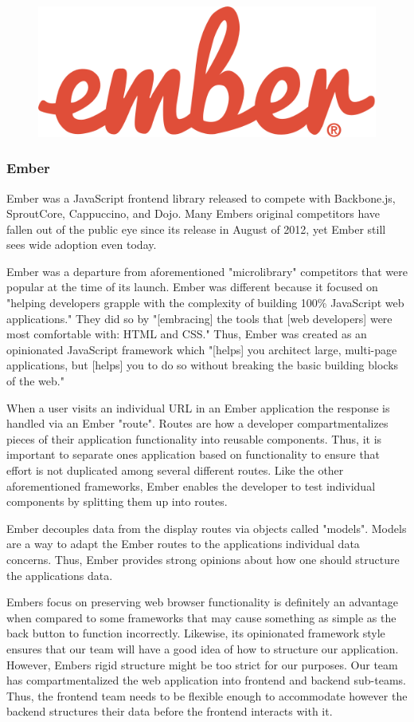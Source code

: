 \documentclass[12pt]{article}
\begin{document}
\begin{figure}[h]
	\centering
	\includegraphics[width=0.25\linewidth]{ember}
\end{figure}

\subsubsection{Ember}

Ember was a JavaScript frontend library released to compete with Backbone.js, SproutCore, Cappuccino, and Dojo.\cite{emberrelease} Many Embers original competitors have fallen out of the public eye since its release in August of 2012, yet Ember still sees wide adoption even today.

Ember was a departure from aforementioned "microlibrary" competitors that were popular at the time of its launch. Ember was different because it focused on "helping developers grapple with the complexity of building 100\% JavaScript web applications."\cite{emberrelease} They did so by "[embracing] the tools that [web developers] were most comfortable with: HTML and CSS."\cite{emberrelease} Thus, Ember was created as an opinionated JavaScript framework which "[helps] you architect large, multi-page applications, but [helps] you to do so without breaking the basic building blocks of the web."\cite{emberrelease}

When a user visits an individual URL in an Ember application the response is handled via an Ember "route".\cite{emberrouting} Routes are how a developer compartmentalizes pieces of their application functionality into reusable components. Thus, it is important to separate ones application based on functionality to ensure that effort is not duplicated among several different routes. Like the other aforementioned frameworks, Ember enables the developer to test individual components by splitting them up into routes.

Ember decouples data from the display routes via objects called "models".\cite{embermodel} Models are a way to adapt the Ember routes to the applications individual data concerns. Thus, Ember provides strong opinions about how one should structure the applications data.

Embers focus on preserving web browser functionality is definitely an advantage when compared to some frameworks that may cause something as simple as the back button to function incorrectly. Likewise, its opinionated framework style ensures that our team will have a good idea of how to structure our application. However, Embers rigid structure might be too strict for our purposes. Our team has compartmentalized the web application into frontend and backend sub-teams. Thus, the frontend team needs to be flexible enough to accommodate however the backend structures their data before the frontend interacts with it.
\end{document}
